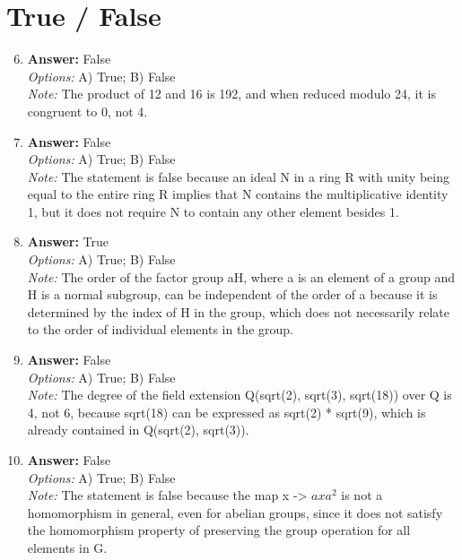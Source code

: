 \documentclass[12pt]{article}
\begin{document}
\section*{True / False}
\begin{enumerate}[label=\arabic*.]
\setcounter{enumi}{5}
\item \textbf{Answer:} False
\\ \textit{Options:} A) True; B) False
\\ \textit{Note:} The product of 12 and 16 is 192, and when reduced modulo 24, it is congruent to 0, not 4.
\item \textbf{Answer:} False
\\ \textit{Options:} A) True; B) False
\\ \textit{Note:} The statement is false because an ideal N in a ring R with unity being equal to the entire ring R implies that N contains the multiplicative identity 1, but it does not require N to contain any other element besides 1.
\item \textbf{Answer:} True
\\ \textit{Options:} A) True; B) False
\\ \textit{Note:} The order of the factor group aH, where a is an element of a group and H is a normal subgroup, can be independent of the order of a because it is determined by the index of H in the group, which does not necessarily relate to the order of individual elements in the group.
\item \textbf{Answer:} False
\\ \textit{Options:} A) True; B) False
\\ \textit{Note:} The degree of the field extension Q(sqrt(2), sqrt(3), sqrt(18)) over Q is 4, not 6, because sqrt(18) can be expressed as sqrt(2) * sqrt(9), which is already contained in Q(sqrt(2), sqrt(3)).
\item \textbf{Answer:} False
\\ \textit{Options:} A) True; B) False
\\ \textit{Note:} The statement is false because the map x -\textgreater{} $axa^2$ is not a homomorphism in general, even for abelian groups, since it does not satisfy the homomorphism property of preserving the group operation for all elements in G.
\end{enumerate}
\end{document}
